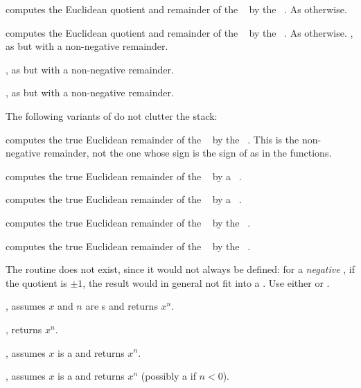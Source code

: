  computes the Euclidean quotient
and remainder of the ~ by the ~. As
 otherwise.

 computes the Euclidean quotient
and remainder of the ~ by the ~. As
 otherwise.
\smallskip
{}, as  but with a
non-negative remainder.

, as  but with a
non-negative remainder.

, as  but with a
non-negative remainder.

 The following variants of  do not
clutter the stack:

 computes the true Euclidean
remainder of the ~ by the ~. This is the
non-negative remainder, not the one whose sign is the sign of 
as in the  functions.

 computes the true Euclidean
remainder of the ~ by a ~.

 computes the true Euclidean
remainder of the ~ by a ~.

 computes the true Euclidean
remainder of the ~ by the ~.

 computes the true Euclidean
remainder of the ~ by the ~.

The routine  does not exist, since it would not always be
defined: for a \emph{negative} , if the quotient is $\pm1$, the result
 would in general not fit into a . Use either
 or .


, assumes $x$ and $n$ are s and
returns $x^n$.

, returns $x^n$.

, assumes $x$ is a  and returns $x^n$.

, assumes $x$ is a  and returns $x^n$
(possibly a  if $n < 0$).


